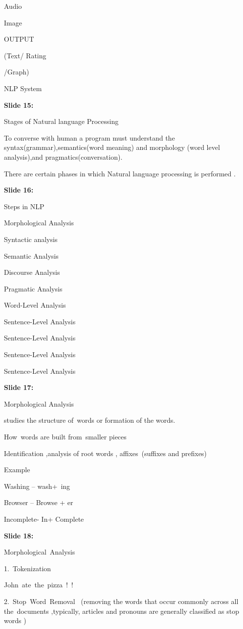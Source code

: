 \documentclass[11pt,a4paper]{article}
\begin{document}
Audio

Image

OUTPUT

(Text/  Rating

/Graph)

NLP System

\textbf{Slide 15:}

Stages of Natural language Processing

To converse with human a program must understand the syntax(grammar),semantics(word meaning) and morphology (word level analysis),and pragmatics(conversation).

There are certain phases in which Natural language processing is performed .

\textbf{Slide 16:}

Steps in NLP

Morphological Analysis

Syntactic analysis

Semantic Analysis

Discourse Analysis

Pragmatic Analysis

Word-Level Analysis

Sentence-Level Analysis

Sentence-Level Analysis

Sentence-Level Analysis

Sentence-Level Analysis

\textbf{Slide 17:}

Morphological Analysis

studies the structure of words or formation of the words.

How words are built from smaller pieces

Identification ,analysis of root words , affixes (suffixes and prefixes)

Example

Washing – wash+ ​ing

Browser – Browse + er

Incomplete- In+ Complete

\textbf{Slide 18:}

Morphological Analysis

1. Tokenization​

John ate the pizza ! !

2. Stop Word Removal  (removing the words that occur commonly across all the documents ,typically, articles and pronouns are generally classified as stop words )​
\end{document}

